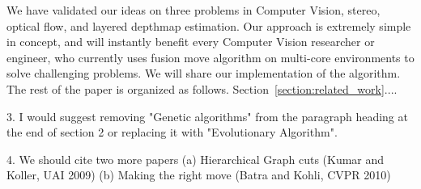 We have validated our ideas on three problems in Computer Vision,
stereo, optical flow, and layered depthmap estimation.   Our approach is extremely simple in concept, and
will instantly benefit every Computer Vision researcher or engineer, who
currently uses fusion move algorithm on multi-core environments to solve
challenging problems. We will share our implementation of the
algorithm. The rest of the paper is organized as
follows. Section~\ref{section:related_work}....


%
%


%



%



%







3. I would suggest removing "Genetic algorithms" from the paragraph heading at the end of section 2 or replacing it with "Evolutionary Algorithm".

4. We should cite two more papers
(a) Hierarchical Graph cuts (Kumar and Koller, UAI 2009)
(b) Making the right move (Batra and Kohli, CVPR 2010)
